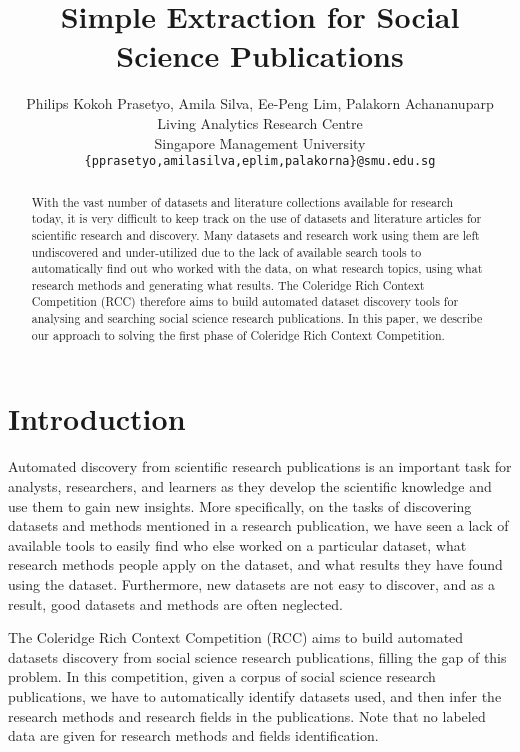 \title{Simple Extraction for Social Science Publications}

\author{Philips Kokoh Prasetyo, Amila Silva, Ee-Peng Lim, Palakorn Achananuparp\\
        Living Analytics Research Centre \\ Singapore Management University \\
        {\tt \{pprasetyo,amilasilva,eplim,palakorna\}@smu.edu.sg}}

\date{}


\maketitle
\begin{abstract}

With the vast number of datasets and literature collections available for research today, it is very difficult to keep track on the use of datasets and literature articles for scientific research and discovery. Many datasets and research work using them are left undiscovered and under-utilized due to the lack of available search tools to automatically find out who worked with the data, on what research topics, using what research methods and generating what results. The Coleridge Rich Context Competition (RCC) therefore aims to build automated dataset discovery tools for analysing and searching social science research publications. In this paper, we describe our approach to solving the first phase of Coleridge Rich Context Competition.

\end{abstract}

\section{Introduction}

Automated discovery from scientific research publications is an important task for analysts, researchers, and learners as they develop the scientific knowledge and use them to gain new insights. More specifically, on the tasks of discovering datasets and methods mentioned in a research publication, we have seen a lack of available tools to easily find who else worked on a particular dataset, what research methods people apply on the dataset, and what results they have found using the dataset. Furthermore, new datasets are not easy to discover, and as a result, good datasets and methods are often neglected.

The Coleridge Rich Context Competition (RCC) aims to build automated datasets discovery from social science research publications, filling the gap of this problem. In this competition, given a corpus of social science research publications, we have to automatically identify datasets used, and then infer the research methods and research fields in the publications. Note that no labeled data are given for research methods and fields identification.

